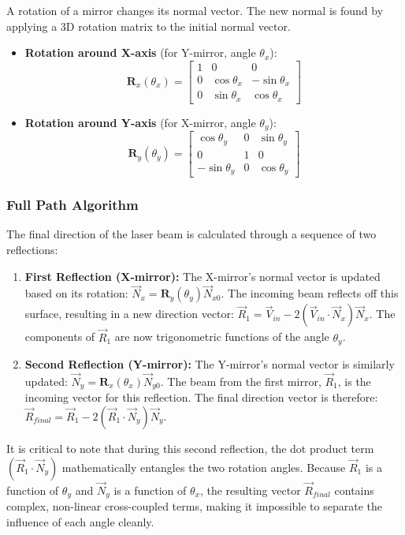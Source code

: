 \documentclass[12pt]{article}
\begin{document}
A rotation of a mirror changes its normal vector. The new normal is found by applying a 3D rotation matrix to the initial normal vector.
\begin{itemize}
\item \textbf{Rotation around X-axis} (for Y-mirror, angle \(\theta_x\)):
\begin{equation}
\mathbf{R}_x(\theta_x) = \begin{bmatrix} 1 & 0 & 0 \\ 0 & \cos\theta_x & -\sin\theta_x \\ 0 & \sin\theta_x & \cos\theta_x \end{bmatrix}
\end{equation}
\item \textbf{Rotation around Y-axis} (for X-mirror, angle \(\theta_y\)):
\begin{equation}
\mathbf{R}_y(\theta_y) = \begin{bmatrix} \cos\theta_y & 0 & \sin\theta_y \\ 0 & 1 & 0 \\ -\sin\theta_y & 0 & \cos\theta_y \end{bmatrix}
\end{equation}
\end{itemize}

\subsubsection{Full Path Algorithm}
The final direction of the laser beam is calculated through a sequence of two reflections:
\begin{enumerate}
\item \textbf{First Reflection (X-mirror):} The X-mirror's normal vector is updated based on its rotation: \(\vec{N}_{x} = \mathbf{R}_y(\theta_y)\vec{N}_{x0}\). The incoming beam reflects off this surface, resulting in a new direction vector: \(\vec{R}_1 = \vec{V}_{in} - 2(\vec{V}_{in} \cdot \vec{N}_{x})\vec{N}_{x}\). The components of \(\vec{R}_1\) are now trigonometric functions of the angle \(\theta_y\).
\item \textbf{Second Reflection (Y-mirror):} The Y-mirror's normal vector is similarly updated: \(\vec{N}_{y} = \mathbf{R}_x(\theta_x)\vec{N}_{y0}\). The beam from the first mirror, \(\vec{R}_1\), is the incoming vector for this reflection. The final direction vector is therefore: \(\vec{R}_{final} = \vec{R}_1 - 2(\vec{R}_1 \cdot \vec{N}_{y})\vec{N}_{y}\).
\end{enumerate}
It is critical to note that during this second reflection, the dot product term \((\vec{R}_1 \cdot \vec{N}_{y})\) mathematically entangles the two rotation angles. Because \(\vec{R}_1\) is a function of \(\theta_y\) and \(\vec{N}_{y}\) is a function of \(\theta_x\), the resulting vector \(\vec{R}_{final}\) contains complex, non-linear cross-coupled terms, making it impossible to separate the influence of each angle cleanly.
\end{document}
